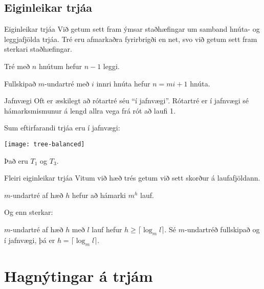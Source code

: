 \documentclass[handout]{beamer}
\begin{document}
\subsection{Eiginleikar trjáa}

\begin{frame}{Eiginleikar trjáa}
Við getum sett fram ýmsar staðhæfingar um samband hnúta- og leggjafjölda trjáa. Tré eru afmarkaðra fyrirbrigði en net, svo við getum sett fram sterkari staðhæfingar.

\begin{tcolorbox}
Tré með $n$ hnútum hefur $n-1$ leggi.
\end{tcolorbox}

\begin{tcolorbox}
Fullskipað $m$-undartré með $i$ innri hnúta hefur $n = mi +1$ hnúta.
\end{tcolorbox}
\end{frame}

\begin{frame}{Jafnvægi}
Oft er æskilegt að rótartré séu ``í jafnvægi''. Rótartré er í jafnvægi sé hámarksmismunur á lengd allra vega frá rót að laufi 1.

\vspace{0.5cm}
Sum eftirfarandi trjáa eru í jafnvægi:
\begin{center}
\texttt{[image: tree-balanced]}
\end{center}
\pause
Það eru $T_1$ og $T_3$.
\end{frame}

\begin{frame}{Fleiri eiginleikar trjáa}
Vitum við hæð trés getum við sett skorður á laufafjöldann.
\begin{tcolorbox}
$m$-undartré af hæð $h$ hefur að hámarki $m^h$ lauf.
\end{tcolorbox}
Og enn sterkar:
\begin{tcolorbox}
$m$-undartré af hæð $h$ með $l$ lauf hefur $h \geq \lceil \log_m l \rceil$. Sé $m$-undartréð fullskipað og í jafnvægi, þá er $h = \lceil \log_m l\rceil$.
\end{tcolorbox}
\end{frame}

\section{Hagnýtingar á trjám}
\end{document}
